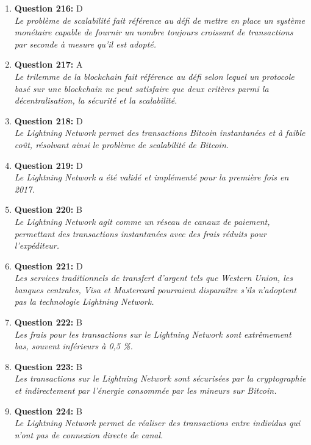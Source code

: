 \documentclass[12pt,a4paper]{article}
\begin{document}
\begin{enumerate}
\item \textbf{Question 216:} D
\\ \textit{Le problème de scalabilité fait référence au défi de mettre en place un système monétaire capable de fournir un nombre toujours croissant de transactions par seconde à mesure qu'il est adopté.}

\item \textbf{Question 217:} A
\\ \textit{Le trilemme de la blockchain fait référence au défi selon lequel un protocole basé sur une blockchain ne peut satisfaire que deux critères parmi la décentralisation, la sécurité et la scalabilité.}

\item \textbf{Question 218:} D
\\ \textit{Le Lightning Network permet des transactions Bitcoin instantanées et à faible coût, résolvant ainsi le problème de scalabilité de Bitcoin.}

\item \textbf{Question 219:} D
\\ \textit{Le Lightning Network a été validé et implémenté pour la première fois en 2017.}

\item \textbf{Question 220:} B
\\ \textit{Le Lightning Network agit comme un réseau de canaux de paiement, permettant des transactions instantanées avec des frais réduits pour l'expéditeur.}

\item \textbf{Question 221:} D
\\ \textit{Les services traditionnels de transfert d'argent tels que Western Union, les banques centrales, Visa et Mastercard pourraient disparaître s'ils n'adoptent pas la technologie Lightning Network.}

\item \textbf{Question 222:} B
\\ \textit{Les frais pour les transactions sur le Lightning Network sont extrêmement bas, souvent inférieurs à 0,5 \%.}

\item \textbf{Question 223:} B
\\ \textit{Les transactions sur le Lightning Network sont sécurisées par la cryptographie et indirectement par l'énergie consommée par les mineurs sur Bitcoin.}

\item \textbf{Question 224:} B
\\ \textit{Le Lightning Network permet de réaliser des transactions entre individus qui n'ont pas de connexion directe de canal.}


\end{enumerate}
\end{document}
